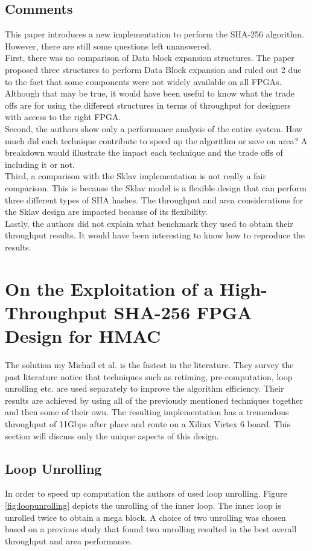 \documentclass[conference]{IEEEtran}
\begin{document}
\subsection{Comments}
This paper introduces a new implementation to perform the SHA-256 algorithm. However, there are still some questions left unanswered.\\ First, there was no comparison of Data block expansion structures. The paper proposed three structures to perform Data Block expansion and ruled out 2 due to the fact that some components were not widely available on all FPGAs. Although that may be true, it would have been useful to know what the trade offs are for using the different structures in terms of throughput for designers with access to the right FPGA. \\Second, the authors show only a performance analysis of the entire system. How much did each technique contribute to speed up the algorithm or save on area? A breakdown would illustrate the impact each technique and the trade offs of including it or not. \\Third, a comparison with the Sklav implementation is not really a fair comparison. This is because the Sklav model is a flexible design that can perform three different types of SHA hashes. The throughput and area considerations for the Sklav design are impacted because of its flexibility.\\Lastly, the authors did not explain what benchmark they used to obtain their throughput results. It would have been interesting to know how to reproduce the results.


\section{On the Exploitation of a High-Throughput SHA-256 FPGA Design for HMAC} \label{Explsha}
The solution my Michail et al. \cite{michail} is the fastest in the literature. They survey the past literature notice that techniques such as retiming, pre-computation, loop unrolling etc. are used separately to improve the algorithm efficiency. Their results are achieved by using all of the previously mentioned techniques together and then some of their own. The resulting implementation has a tremendous throughput of 11Gbps after place and route on a Xilinx Virtex 6 board. This section will discuss only the unique aspects of this design.

\subsection{Loop Unrolling}
In order to speed up computation the authors of \cite{michail} used loop unrolling. Figure \ref{fig:loopunrolling} depicts the unrolling of the inner loop. The inner loop is unrolled twice to obtain a mega block. A choice of two unrolling was chosen based on a previous study that found two unrolling resulted in the best overall throughput and area performance.
\end{document}
